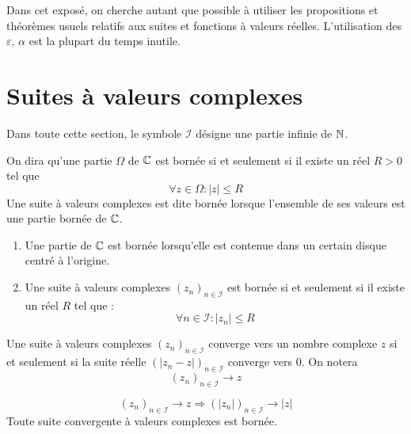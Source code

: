 

Dans cet exposé, on cherche autant que possible à utiliser les propositions et théorèmes usuels relatifs aux suites et fonctions à valeurs réelles. L'utilisation des $\varepsilon$, $\alpha$ est la plupart du temps inutile.

\section{Suites à valeurs complexes}
Dans toute cette section, le symbole $\mathcal I$ désigne une partie infinie de $\mathbb{N}$.
\begin{defi}
 On dira qu'une partie $\Omega$ de $\mathbb{C}$ est bornée si et seulement si il existe un réel $R>0$ tel que 
\begin{displaymath}
 \forall z\in \Omega : |z|\leq R
\end{displaymath}
Une suite à valeurs complexes est dite bornée lorsque l'ensemble de ses valeurs est une partie bornée de $\mathbb{C}$.
\end{defi}
\begin{rems}
\begin{enumerate}
 \item Une partie de $\mathbb{C}$ est bornée lorsqu'elle est contenue dans un certain disque centré à l'origine.
\item Une suite à valeurs complexes $(z_n)_{n\in \mathcal I}$ est bornée si et seulement si il existe un réel $R$ tel que :
\begin{displaymath}
 \forall n\in \mathcal I : |z_n|\leq R
\end{displaymath}
\end{enumerate}
\end{rems}

\begin{defi}
 Une suite à valeurs complexes $(z_n)_{n\in \mathcal I}$ converge vers un nombre complexe $z$ si et seulement si la suite réelle $(|z_n-z|)_{n\in \mathcal I}$ converge vers $0$. On notera 
\begin{displaymath}
 (z_n)_{n\in \mathcal I} \rightarrow z 
\end{displaymath}
\end{defi}

\begin{prop}
\begin{displaymath}
 (z_n)_{n\in \mathcal I} \rightarrow z \Rightarrow (|z_n|)_{n\in \mathcal I} \rightarrow |z|
\end{displaymath}
Toute suite convergente à valeurs complexes est bornée.
\end{prop}

